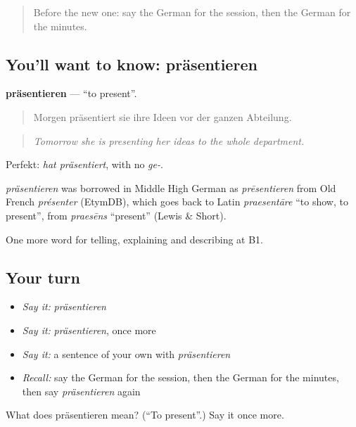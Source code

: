 \begin{quote}
Before the new one: say the German for the session, then the German for the minutes.
\end{quote}

\subsection*{You'll want to know: präsentieren}
\textbf{präsentieren} — \textquotedblleft{}to present\textquotedblright{}.

\begin{quote}
Morgen präsentiert sie ihre Ideen vor der ganzen Abteilung.
\end{quote}

\begin{quote}
\emph{Tomorrow she is presenting her ideas to the whole department.}
\end{quote}

Perfekt: \emph{hat präsentiert}, with no \emph{ge-}.

\begin{cousinweb}
\emph{präsentieren} was borrowed in Middle High German as \emph{prēsentieren} from Old French \emph{présenter} (EtymDB), which goes back to Latin \emph{praesentāre} \textquotedblleft{}to show, to present\textquotedblright{}, from \emph{praesēns} \textquotedblleft{}present\textquotedblright{} (Lewis \& Short).
\end{cousinweb}

\begin{grammarlens}[title={What you've built}]
One more word for telling, explaining and describing at B1.
\end{grammarlens}

\subsection*{Your turn}
\begin{itemize}
\raggedright
  \item \emph{Say it:} \emph{präsentieren}
  \item \emph{Say it:} \emph{präsentieren}, once more
  \item \emph{Say it:} a sentence of your own with \emph{präsentieren}
  \item \emph{Recall:} say the German for the session, then the German for the minutes, then say \emph{präsentieren} again
\end{itemize}

\begin{tcolorbox}[breakable,colback=teal!4,colframe=teal!35!black,title={Before you move on}]
What does präsentieren mean? (\textquotedblleft{}To present\textquotedblright{}.) Say it once more.
\end{tcolorbox}
